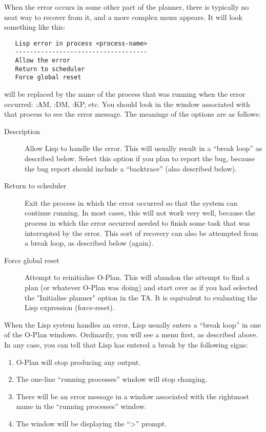 When the error occurs in some other part of the planner, there is
typically no neat way to recover from it, and a more complex menu
appears.  It will look something like this:

\begin{verbatim}
   Lisp error in process <process-name>
   ------------------------------------
   Allow the error
   Return to scheduler
   Force global reset
\end{verbatim}

{\tt <Process-name>} will be replaced by the name of the process that was
running when the error occurred: :AM, :DM, :KP, etc.  You should
look in the window associated with that process to see the error
message.  The meanings of the options are as follows:

\begin{description}
\item[Description] Allow Lisp to handle the error.  This will usually
result in a ``break loop'' as described below.  Select this option if
you plan to report the bug, because the bug report should include a
``backtrace'' (also described below).

\item[Return to scheduler] Exit the process in which the error
occurred so that the system can continue running.  In most cases, this
will not work very well, because the process in which the error
occurred needed to finish some task that was interrupted by the error.
This sort of recovery can also be attempted from a break loop, as
described below (again).

\item[Force global reset] Attempt to reinitialise O-Plan.  This will
abandon the attempt to find a plan (or whatever O-Plan was doing) and
start over as if you had selected the "Initialise planner" option in
the TA.  It is equivalent to evaluating the Lisp expression
(force-reset).
\end{description}

When the Lisp system handles an error, Lisp usually enters a ``break
loop'' in one of the O-Plan windows.  Ordinarily, you will see a menu
first, as described above.  In any case, you can tell that Lisp has
entered a break by the following signs:

\begin{enumerate}
\item O-Plan will stop producing any output.
\item The one-line ``running processes'' window will stop changing.
\item There will be an error message in a window associated with
the rightmost name in the ``running processes'' window.
\item The window will be displaying the ``>'' prompt.
\end{enumerate}

